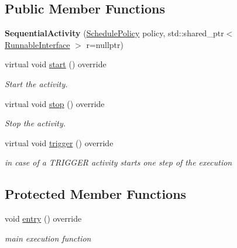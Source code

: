\subsection*{Public Member Functions}
\begin{DoxyCompactItemize}
\item 
\hypertarget{classcoco_1_1_sequential_activity_ac7ba1d0816d9ab6cbf43493e64e48ecd}{{\bfseries Sequential\-Activity} (\hyperlink{structcoco_1_1_schedule_policy}{Schedule\-Policy} policy, std\-::shared\-\_\-ptr$<$ \hyperlink{classcoco_1_1_runnable_interface}{Runnable\-Interface} $>$ r=nullptr)}\label{classcoco_1_1_sequential_activity_ac7ba1d0816d9ab6cbf43493e64e48ecd}

\item 
\hypertarget{classcoco_1_1_sequential_activity_a29995fe18e3162f0c04787d7db9bda19}{virtual void \hyperlink{classcoco_1_1_sequential_activity_a29995fe18e3162f0c04787d7db9bda19}{start} () override}\label{classcoco_1_1_sequential_activity_a29995fe18e3162f0c04787d7db9bda19}

\begin{DoxyCompactList}\small\item\em Start the activity. \end{DoxyCompactList}\item 
\hypertarget{classcoco_1_1_sequential_activity_ab1d6827509bee10cd26bbfae3b5fb857}{virtual void \hyperlink{classcoco_1_1_sequential_activity_ab1d6827509bee10cd26bbfae3b5fb857}{stop} () override}\label{classcoco_1_1_sequential_activity_ab1d6827509bee10cd26bbfae3b5fb857}

\begin{DoxyCompactList}\small\item\em Stop the activity. \end{DoxyCompactList}\item 
\hypertarget{classcoco_1_1_sequential_activity_a9e619d6d2df7e843cbbfeacd99193446}{virtual void \hyperlink{classcoco_1_1_sequential_activity_a9e619d6d2df7e843cbbfeacd99193446}{trigger} () override}\label{classcoco_1_1_sequential_activity_a9e619d6d2df7e843cbbfeacd99193446}

\begin{DoxyCompactList}\small\item\em in case of a T\-R\-I\-G\-G\-E\-R activity starts one step of the execution \end{DoxyCompactList}\end{DoxyCompactItemize}
\subsection*{Protected Member Functions}
\begin{DoxyCompactItemize}
\item 
\hypertarget{classcoco_1_1_sequential_activity_ac64d096bd0a06344cca6803c9874094d}{void \hyperlink{classcoco_1_1_sequential_activity_ac64d096bd0a06344cca6803c9874094d}{entry} () override}\label{classcoco_1_1_sequential_activity_ac64d096bd0a06344cca6803c9874094d}

\begin{DoxyCompactList}\small\item\em main execution function \end{DoxyCompactList}\end{DoxyCompactItemize}
